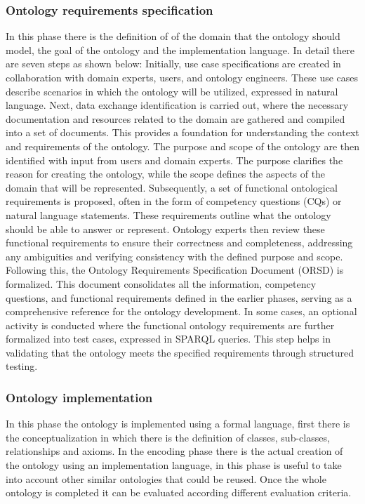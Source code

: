 \subsubsection{Ontology requirements specification}
In this phase there is the definition of of the domain that the ontology should model, the goal of the ontology and the implementation language. In detail there are seven steps as shown below:
Initially, use case specifications are created in collaboration with domain experts, users, and ontology engineers. These use cases describe scenarios in which the ontology will be utilized, expressed in natural language. Next, data exchange identification is carried out, where the necessary documentation and resources related to the domain are gathered and compiled into a set of documents. This provides a foundation for understanding the context and requirements of the ontology. The purpose and scope of the ontology are then identified with input from users and domain experts. The purpose clarifies the reason for creating the ontology, while the scope defines the aspects of the domain that will be represented. Subsequently, a set of functional ontological requirements is proposed, often in the form of competency questions (CQs) or natural language statements. These requirements outline what the ontology should be able to answer or represent. Ontology experts then review these functional requirements to ensure their correctness and completeness, addressing any ambiguities and verifying consistency with the defined purpose and scope. Following this, the Ontology Requirements Specification Document (ORSD) is formalized. This document consolidates all the information, competency questions, and functional requirements defined in the earlier phases, serving as a comprehensive reference for the ontology development. In some cases, an optional activity is conducted where the functional ontology requirements are further formalized into test cases, expressed in SPARQL queries. This step helps in validating that the ontology meets the specified requirements through structured testing.

\subsubsection{Ontology implementation}
In this phase the ontology is implemented using a formal language, first there is the conceptualization in which there is the definition of classes, sub-classes, relationships and axioms. In the encoding phase there is the actual creation of the ontology using an implementation language, in this phase is useful to take into account other similar ontologies that could be reused. Once the whole ontology is completed it can be evaluated according different evaluation criteria. 

